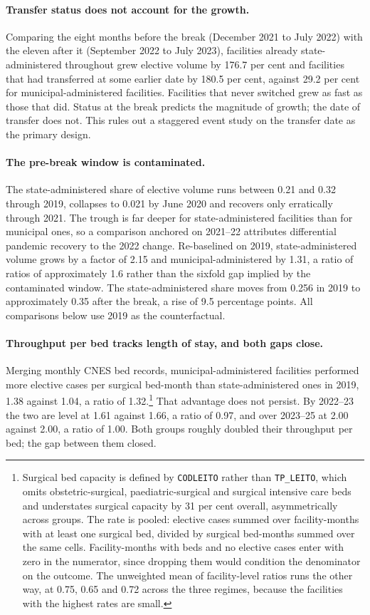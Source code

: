\paragraph{Transfer status does not account for the growth.} Comparing the eight months
before the break (December 2021 to July 2022) with the eleven after it
(September 2022 to July 2023), facilities already state-administered throughout
grew elective volume by 176.7 per cent and facilities that had transferred at
some earlier date by 180.5 per cent, against 29.2 per cent for
municipal-administered facilities. Facilities that never switched grew as fast
as those that did. Status at the break predicts the magnitude of growth;
the date of transfer does not. This rules out a staggered event study on the
transfer date as the primary design.

\paragraph{The pre-break window is contaminated.} The state-administered share
of elective volume runs between 0.21 and 0.32 through 2019, collapses to 0.021
by June 2020 and recovers only erratically through 2021. The trough is far
deeper for state-administered facilities than for municipal ones, so a
comparison anchored on 2021--22 attributes differential pandemic recovery to the 2022 change. Re-baselined on 2019, state-administered volume grows by a factor of
2.15 and municipal-administered by 1.31, a ratio of ratios of approximately 1.6
rather than the sixfold gap implied by the contaminated window. The
state-administered share moves from 0.256 in 2019 to approximately 0.35 after
the break, a rise of 9.5 percentage points. All comparisons below use 2019 as
the counterfactual.

\paragraph{Throughput per bed tracks length of stay, and both gaps close.}
Merging monthly CNES bed records, municipal-administered facilities performed
more elective cases per surgical bed-month than state-administered ones in 2019,
1.38 against 1.04, a ratio of 1.32.\footnote{Surgical bed capacity is defined by
\texttt{CODLEITO} rather than \texttt{TP\_LEITO}, which omits obstetric-surgical,
paediatric-surgical and surgical intensive care beds and understates surgical
capacity by 31 per cent overall, asymmetrically across groups. The rate is
pooled: elective cases summed over facility-months with at least one surgical
bed, divided by surgical bed-months summed over the same cells. Facility-months
with beds and no elective cases enter with zero in the numerator, since dropping
them would condition the denominator on the outcome. The unweighted mean of
facility-level ratios runs the other way, at 0.75, 0.65 and 0.72 across the three
regimes, because the facilities with the highest rates are small.} That advantage
does not persist. By 2022--23 the two are level at 1.61 against 1.66, a ratio of
0.97, and over 2023--25 at 2.00 against 2.00, a ratio of 1.00. Both groups roughly
doubled their throughput per bed; the gap between them closed.


